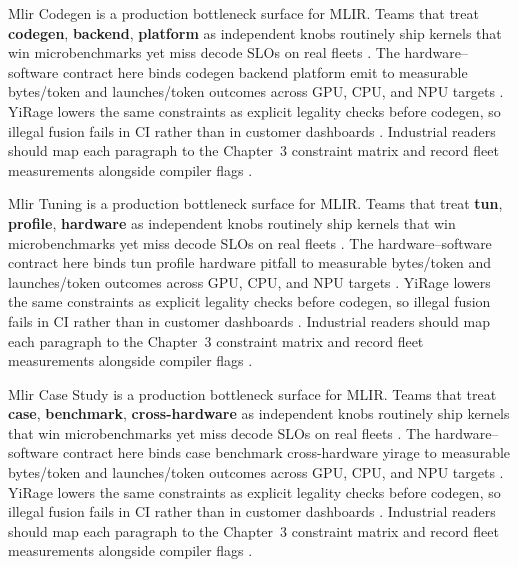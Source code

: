 Mlir Codegen is a production bottleneck surface for MLIR. Teams that treat \textbf{codegen}, \textbf{backend}, \textbf{platform} as independent knobs routinely ship kernels that win microbenchmarks yet miss decode SLOs on real fleets \citep{semianalysis2024tma,dlbook}. The hardware--software contract here binds codegen backend platform emit to measurable bytes/token and launches/token outcomes across GPU, CPU, and NPU targets \citep{amd2024xdna,dao2022flashattention}. YiRage lowers the same constraints as explicit legality checks before codegen, so illegal fusion fails in CI rather than in customer dashboards \citep{amd2024aie,kwon2023vllm}. Industrial readers should map each paragraph to the Chapter~3 constraint matrix and record fleet measurements alongside compiler flags \citep{dlbook,nvidia2024cudagraphs}.

Mlir Tuning is a production bottleneck surface for MLIR. Teams that treat \textbf{tun}, \textbf{profile}, \textbf{hardware} as independent knobs routinely ship kernels that win microbenchmarks yet miss decode SLOs on real fleets \citep{amd2024xdna,dao2022flashattention}. The hardware--software contract here binds tun profile hardware pitfall to measurable bytes/token and launches/token outcomes across GPU, CPU, and NPU targets \citep{amd2024aie,kwon2023vllm}. YiRage lowers the same constraints as explicit legality checks before codegen, so illegal fusion fails in CI rather than in customer dashboards \citep{dlbook,nvidia2024cudagraphs}. Industrial readers should map each paragraph to the Chapter~3 constraint matrix and record fleet measurements alongside compiler flags \citep{dao2022flashattention,liu2024deepseekv3}.

Mlir Case Study is a production bottleneck surface for MLIR. Teams that treat \textbf{case}, \textbf{benchmark}, \textbf{cross-hardware} as independent knobs routinely ship kernels that win microbenchmarks yet miss decode SLOs on real fleets \citep{amd2024aie,kwon2023vllm}. The hardware--software contract here binds case benchmark cross-hardware yirage to measurable bytes/token and launches/token outcomes across GPU, CPU, and NPU targets \citep{dlbook,nvidia2024cudagraphs}. YiRage lowers the same constraints as explicit legality checks before codegen, so illegal fusion fails in CI rather than in customer dashboards \citep{dao2022flashattention,liu2024deepseekv3}. Industrial readers should map each paragraph to the Chapter~3 constraint matrix and record fleet measurements alongside compiler flags \citep{kwon2023vllm,patel2025llminference}.

